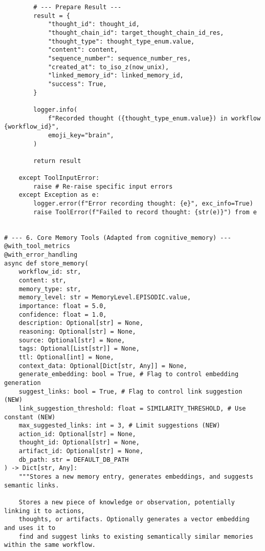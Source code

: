 \documentclass[12pt,a4paper]{article}
\begin{document}
\begin{pageablecode}
\begin{verbatim}
        # --- Prepare Result ---
        result = {
            "thought_id": thought_id,
            "thought_chain_id": target_thought_chain_id_res,
            "thought_type": thought_type_enum.value,
            "content": content,
            "sequence_number": sequence_number_res,
            "created_at": to_iso_z(now_unix),
            "linked_memory_id": linked_memory_id,
            "success": True,
        }

        logger.info(
            f"Recorded thought ({thought_type_enum.value}) in workflow {workflow_id}",
            emoji_key="brain",
        )

        return result

    except ToolInputError:
        raise # Re-raise specific input errors
    except Exception as e:
        logger.error(f"Error recording thought: {e}", exc_info=True)
        raise ToolError(f"Failed to record thought: {str(e)}") from e
    

# --- 6. Core Memory Tools (Adapted from cognitive_memory) ---
@with_tool_metrics
@with_error_handling
async def store_memory(
    workflow_id: str,
    content: str,
    memory_type: str,
    memory_level: str = MemoryLevel.EPISODIC.value,
    importance: float = 5.0,
    confidence: float = 1.0,
    description: Optional[str] = None,
    reasoning: Optional[str] = None,
    source: Optional[str] = None,
    tags: Optional[List[str]] = None,
    ttl: Optional[int] = None,
    context_data: Optional[Dict[str, Any]] = None,
    generate_embedding: bool = True, # Flag to control embedding generation
    suggest_links: bool = True, # Flag to control link suggestion (NEW)
    link_suggestion_threshold: float = SIMILARITY_THRESHOLD, # Use constant (NEW)
    max_suggested_links: int = 3, # Limit suggestions (NEW)
    action_id: Optional[str] = None,
    thought_id: Optional[str] = None,
    artifact_id: Optional[str] = None,
    db_path: str = DEFAULT_DB_PATH
) -> Dict[str, Any]:
    """Stores a new memory entry, generates embeddings, and suggests semantic links.

    Stores a new piece of knowledge or observation, potentially linking it to actions,
    thoughts, or artifacts. Optionally generates a vector embedding and uses it to
    find and suggest links to existing semantically similar memories within the same workflow.


\end{verbatim}
\end{pageablecode}
\end{document}
